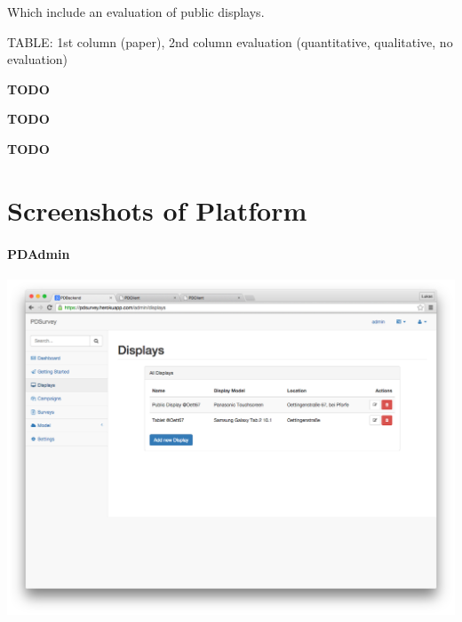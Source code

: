     Which include an evaluation of public displays.

    TABLE: 1st column (paper), 2nd column evaluation (quantitative, qualitative, no evaluation)

  \textbf{TODO}

  \textbf{TODO}

  \textbf{TODO}








\clearpage

\label{appendix:interviews}

  
  \label{appendix:interview-participant}

  
  \label{appendix:interview-passerby}

  
  \label{appendix:semi-structured-interview}





\cleardoublepage
\section{Screenshots of Platform}




\paragraph{PDAdmin}


 \label{screenshot:pdadmin-displays}
    \begin{center}
        \includegraphics[width=\columnwidth]{img/screenshots/pdadmin/displays.png}
    \end{center}


